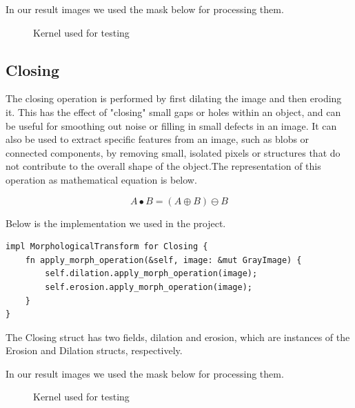 \documentclass[12pt]{article}
\begin{document}
In our result images we used the mask below for processing them.
\begin{figure}[H]\centering
    \begin{subfigure}[t]{.2\textwidth}\centering
    \end{subfigure}
    \caption{Kernel used for testing}
\end{figure}

\subsection{Closing}

The closing operation is performed by first dilating the image and then eroding it. This has the effect of "closing" small gaps or holes within an object, and can be useful for smoothing out noise or filling in small defects in an image. It can also be used to extract specific features from an image, such as blobs or connected components, by removing small, isolated pixels or structures that do not contribute to the overall shape of the object.The representation of this operation as mathematical equation is below.

\begin{equation}
   A \bullet B  = ( A \oplus B )\ominus B
\end{equation}

Below is the implementation we used in the project.
\begin{lstlisting}
impl MorphologicalTransform for Closing {
    fn apply_morph_operation(&self, image: &mut GrayImage) {
    	self.dilation.apply_morph_operation(image);
        self.erosion.apply_morph_operation(image);
    }
}
\end{lstlisting}

The Closing struct has two fields, dilation and erosion, which are instances of the Erosion and Dilation structs, respectively.

In our result images we used the mask below for processing them.
\begin{figure}[H]\centering
    \begin{subfigure}[t]{.2\textwidth}\centering
    \end{subfigure}
    \caption{Kernel used for testing}
\end{figure}
\end{document}
